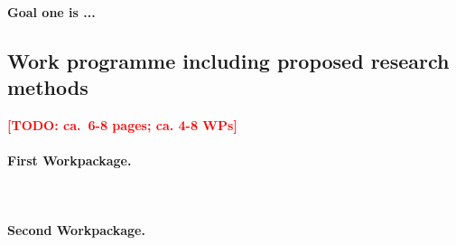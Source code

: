 \documentclass{scrartcl}
\newcommand{\todo}[1]{\xspace{\textcolor{red}{\bfseries[TODO: #1]}}\xspace}
\begin{document}
\paragraph{\textnormal{Goal one is ...}}

\subsection{Work programme including proposed research methods}
\todo{ca.\ 6-8 pages; ca. 4-8 WPs}

\addtocounter{secnumdepth}{1}
\renewcommand{\theparagraph}{WP\arabic{paragraph}}

\vspace*{0.5cm}\hrulefill
\paragraph{First Workpackage.}\mbox{}\\
\hrulefill
\label{wp:1}



\vspace*{0.5cm}\hrulefill
\paragraph{Second Workpackage.}\mbox{}\\
\hrulefill
\label{wp:2}





\let\theparagraph=\oldpara
\end{document}
